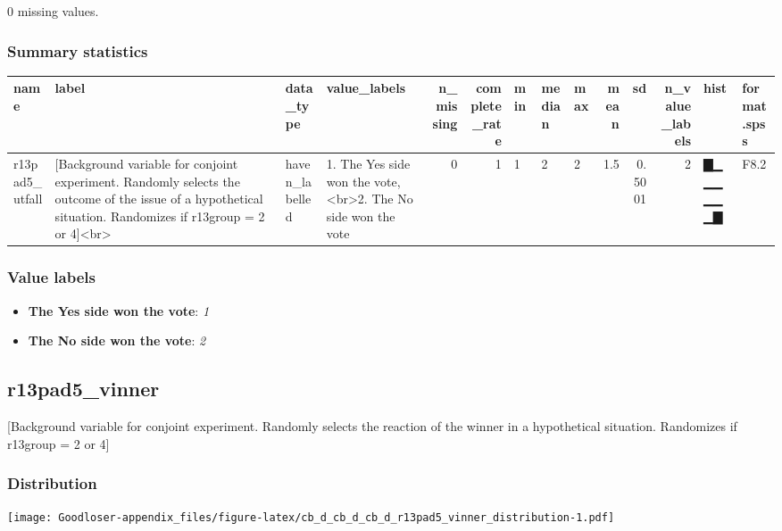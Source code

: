 \documentclass[
]{book}
\providecommand{\tightlist}{%
  \setlength{\itemsep}{0pt}\setlength{\parskip}{0pt}}
\begin{document}
0 missing values.

\hypertarget{r13pad5_utfall_summary}{%
\subsubsection{Summary statistics}\label{r13pad5_utfall_summary}}

\begin{tabular}{l|l|l|l|r|r|l|l|l|r|r|r|l|l}
\hline
name & label & data_type & value_labels & n_missing & complete_rate & min & median & max & mean & sd & n_value_labels & hist & format.spss\\
\hline
r13pad5_utfall & [Background variable for conjoint experiment. Randomly selects the outcome of the issue of a hypothetical situation. Randomizes if r13group = 2 or 4]<br> & haven_labelled & 1. The Yes side won the vote,<br>2. The No side won the vote & 0 & 1 & 1 & 2 & 2 & 1.5 & 0.5001 & 2 & ▇▁▁▁▁▁▁▇ & F8.2\\
\hline
\end{tabular}

\hypertarget{r13pad5_utfall_labels}{%
\subsubsection{Value labels}\label{r13pad5_utfall_labels}}

\begin{itemize}
\tightlist
\item
  \textbf{The Yes side won the vote}: \emph{1}
\item
  \textbf{The No side won the vote}: \emph{2}
\end{itemize}

\hypertarget{r13pad5_vinner}{%
\subsection{r13pad5\_vinner}\label{r13pad5_vinner}}

{[}Background variable for conjoint experiment. Randomly selects the reaction of the winner in a hypothetical situation. Randomizes if r13group = 2 or 4{]}

\hypertarget{r13pad5_vinner_distribution}{%
\subsubsection{Distribution}\label{r13pad5_vinner_distribution}}

\texttt{[image: Goodloser-appendix\_files/figure-latex/cb\_d\_cb\_d\_cb\_d\_r13pad5\_vinner\_distribution-1.pdf]}
\end{document}
